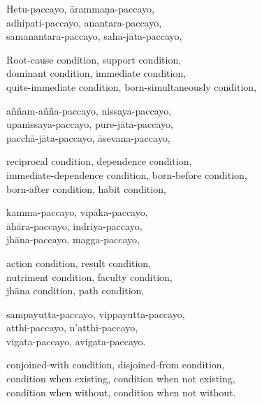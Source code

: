

Hetu-paccayo, ārammaṇa-paccayo,\\
adhipati-paccayo, anantara-paccayo,\\
samanantara-paccayo, saha-jāta-paccayo,

\begin{english}
  Root-cause condition, support condition,\\
  dominant condition, immediate condition,\\
  quite-immediate condition, born-simultaneously condition,
\end{english}

aññam-añña-paccayo, nissaya-paccayo,\\
upanissaya-paccayo, pure-jāta-paccayo,\\
pacchā-jāta-paccayo, āsevana-paccayo,

\begin{english}
  reciprocal condition, dependence condition,\\
  immediate-dependence condition, born-before condition,\\
  born-after condition, habit condition,
\end{english}

kamma-paccayo, vipāka-paccayo,\\
āhāra-paccayo, indriya-paccayo,\\
jhāna-paccayo, magga-paccayo,

\begin{english}
  action condition, result condition,\\
  nutriment condition, faculty condition,\\
  jhāna condition, path condition,
\end{english}

sampayutta-paccayo, vippayutta-paccayo,\\
atthi-paccayo, n'atthi-paccayo,\\
vigata-paccayo, avigata-paccayo.

\begin{english}
  conjoined-with condition, disjoined-from condition,\\
  condition when existing, condition when not existing,\\
  condition when without, condition when not without.
\end{english}


